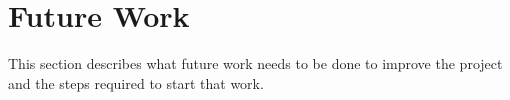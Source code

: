\section{Future Work}
This section describes what future work needs to be done to improve the project
and the steps required to start that work.